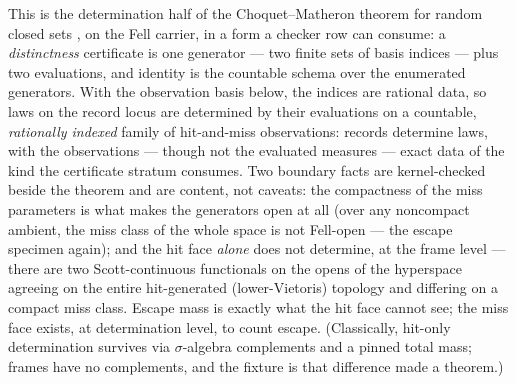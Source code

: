 This is the determination half of the Choquet--Matheron theorem for
random closed sets \cite{matheron75}, on the Fell carrier, in a form
a checker row can consume: a \emph{distinctness} certificate is one
generator --- two finite sets of basis indices --- plus two
evaluations, and identity is the countable schema over the enumerated
generators. With the observation basis below, the indices are
rational data, so laws on the record locus are determined by their
evaluations on a countable, \emph{rationally indexed} family of
hit-and-miss observations: records
determine laws, with the observations --- though not the evaluated
measures --- exact data of the kind the certificate stratum
consumes. Two boundary facts are kernel-checked beside the theorem
and are content, not caveats: the compactness of the miss
parameters is what makes the generators open at all (over
any noncompact ambient, the miss class of the whole space is not
Fell-open --- the escape specimen again); and the hit face
\emph{alone} does not determine, at the frame level --- there are two
Scott-continuous functionals on the opens of the hyperspace agreeing
on the entire hit-generated (lower-Vietoris) topology and differing
on a compact miss class. Escape mass is
exactly what the hit face cannot see; the miss face
exists, at determination level, to count escape. (Classically,
hit-only determination survives via $\sigma$-algebra complements and
a pinned total mass; frames have no complements, and the fixture is
that difference made a theorem.)

